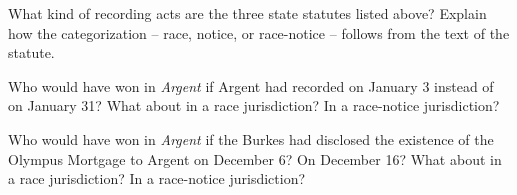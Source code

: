 
\item What kind of recording acts are the three state statutes listed above?
Explain how the categorization -- race, notice, or race-notice -- follows from
the text of the statute.


\item Who would have won in \textit{Argent} if Argent had recorded on January 3
instead of on January 31? What about in a race jurisdiction? In a race-notice
jurisdiction?


\item Who would have won in \textit{Argent} if the Burkes had disclosed the
existence of the Olympus Mortgage to Argent on December 6? On December 16? What
about in a race jurisdiction? In a race-notice jurisdiction?

